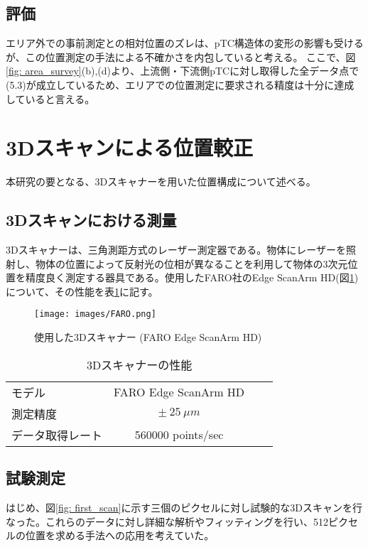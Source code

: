 \documentclass[Yonemoto_master.tex]{subfiles}
\begin{document}
\subsection{評価}
エリア外での事前測定との相対位置のズレは、pTC構造体の変形の影響も受けるが、この位置測定の手法による不確かさを内包していると考える。
ここで、図\ref{fig: area_survey}(b),(d)より、上流側・下流側pTCに対し取得した全データ点で(5.3)が成立しているため、エリアでの位置測定に要求される精度は十分に達成していると言える。

\clearpage

\section{3Dスキャンによる位置較正}
本研究の要となる、3Dスキャナーを用いた位置構成について述べる。

\subsection{3Dスキャンにおける測量}
3Dスキャナーは、三角測距方式のレーザー測定器である。物体にレーザーを照射し、物体の位置によって反射光の位相が異なることを利用して物体の3次元位置を精度良く測定する器具である。使用したFARO社のEdge ScanArm HD(図\ref{fig: FARO})について、その性能を表\ref{tab: FARO_spec}に記す。
\begin{figure}[h]
  \centering
  \texttt{[image: images/FARO.png]}
  \caption{使用した3Dスキャナー (FARO Edge ScanArm HD)}
  \label{fig: FARO}
\end{figure}

\begin{table}[h]
 \centering
 \caption{3Dスキャナーの性能 \cite{FARO}}
 \label{tab: FARO_spec}
  \begin{tabular}{lccc}
   \hline
   モデル & FARO Edge ScanArm HD \\
   測定精度 & $\pm \ 25 \ \mu m$ \\
   データ取得レート & 560000 points/sec \\
   \hline
  \end{tabular}
\end{table}


\subsection{試験測定}

はじめ、図\ref{fig: first_scan}に示す三個のピクセルに対し試験的な3Dスキャンを行なった。これらのデータに対し詳細な解析やフィッティングを行い、512ピクセルの位置を求める手法への応用を考えていた。
\end{document}
